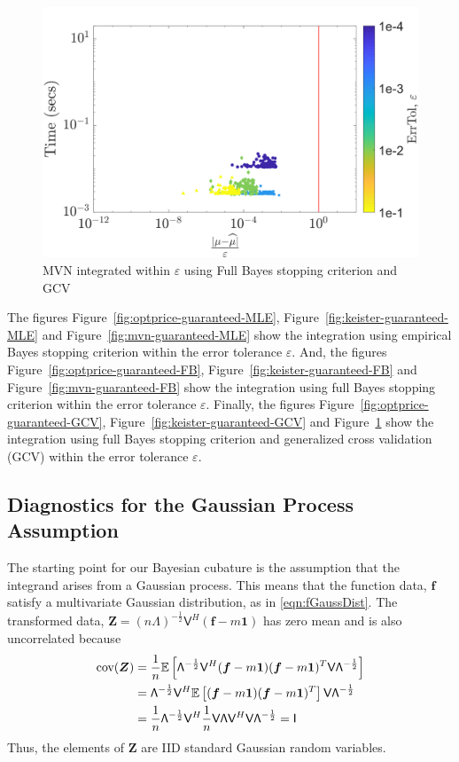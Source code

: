 \documentclass[twocolumn]{svjour3}          %
\newcommand{\bm}[1]{\boldsymbol{#1}}
\newcommand{\Ex}{\mathbb{E}}
\newcommand{\vf}{\bm{f}}
\newcommand{\vZ}{\bm{Z}}
\newcommand{\vone}{\bm{1}}
\newcommand{\cov}{{\textup{cov}}}
\newcommand{\mLambda}{\mathsf{\Lambda}}
\newcommand{\mV}{\mathsf{V}}
\newcommand\figref{Figure~\ref}
\begin{document}
\begin{figure}
	\centering
	\includegraphics[width=0.95\linewidth]{"figures/MVN_guaranteed_time_GCV_C0_29-Jul-2018 04-03-09"}
	\caption[MVN guaranteed : GCV]{MVN integrated within $\varepsilon$ using Full Bayes stopping criterion and GCV}
	\label{fig:mvn-guaranteed-GCV}
\end{figure}



The figures \figref{fig:optprice-guaranteed-MLE}, \figref{fig:keister-guaranteed-MLE} and \figref{fig:mvn-guaranteed-MLE} show the integration using empirical Bayes stopping criterion within the error tolerance $\varepsilon$. 
And, the figures \figref{fig:optprice-guaranteed-FB}, \figref{fig:keister-guaranteed-FB} and \figref{fig:mvn-guaranteed-FB} show the integration using full Bayes stopping criterion within the error tolerance $\varepsilon$.
Finally, the figures \figref{fig:optprice-guaranteed-GCV}, \figref{fig:keister-guaranteed-GCV} and \figref{fig:mvn-guaranteed-GCV} show the integration using full Bayes stopping criterion and generalized cross validation (GCV) within the error tolerance $\varepsilon$.





\subsection{Diagnostics for the Gaussian Process Assumption}


The starting point for our Bayesian cubature is the assumption that the integrand arises from a Gaussian process. This means that the function data, $\vf$ satisfy a multivariate Gaussian distribution, as in \eqref{eqn:fGaussDist}.  The transformed data, $\vZ = ( n\mLambda)^{-\frac 12} \mV^H(\vf - m \vone)$ has zero mean and is also uncorrelated because
\begin{align*}
\cov (\vZ) 
&= \frac 1n \Ex\left[  
\mLambda^{-\frac 12} \mV^H (\vf - m \vone)
(\vf - m \vone)^T \mV \mLambda^{-\frac 12}
\right]
\\
&=
 \mLambda^{-\frac 12} \mV^H 
\Ex\left[ (\vf - m \vone)
(\vf - m \vone)^T \right] \mV \mLambda^{-\frac 12}
\\
&=
\frac{1}{n} \mLambda^{-\frac 12} \mV^H 
\frac 1n \mV \mLambda \mV^H \mV \mLambda^{-\frac 12}
 = \mathsf{I}
\end{align*}
Thus, the elements of $\vZ$ are IID standard Gaussian random variables.  
\end{document}
